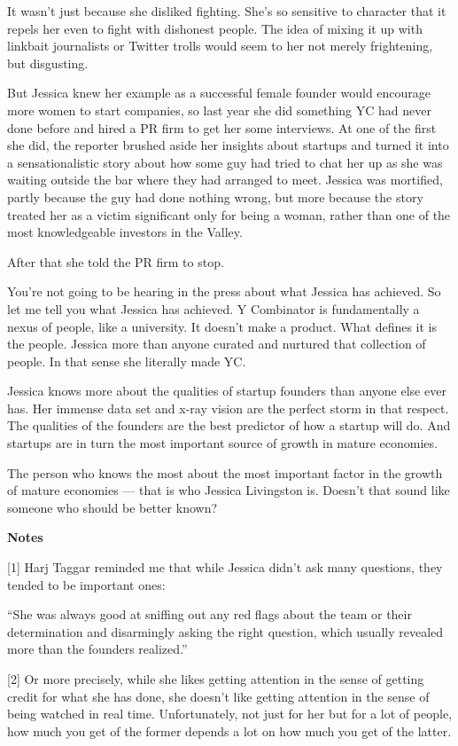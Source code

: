 It wasn't just because she disliked fighting. She's so sensitive to
character that it repels her even to fight with dishonest people. The
idea of mixing it up with linkbait journalists or Twitter trolls would
seem to her not merely frightening, but disgusting.

But Jessica knew her example as a successful female founder would
encourage more women to start companies, so last year she did something
YC had never done before and hired a PR firm to get her some interviews.
At one of the first she did, the reporter brushed aside her insights
about startups and turned it into a sensationalistic story about how
some guy had tried to chat her up as she was waiting outside the bar
where they had arranged to meet. Jessica was mortified, partly because
the guy had done nothing wrong, but more because the story treated her
as a victim significant only for being a woman, rather than one of the
most knowledgeable investors in the Valley.

After that she told the PR firm to stop.

You're not going to be hearing in the press about what Jessica has
achieved. So let me tell you what Jessica has achieved. Y Combinator is
fundamentally a nexus of people, like a university. It doesn't make a
product. What defines it is the people. Jessica more than anyone curated
and nurtured that collection of people. In that sense she literally made
YC.

Jessica knows more about the qualities of startup founders than anyone
else ever has. Her immense data set and x-ray vision are the perfect
storm in that respect. The qualities of the founders are the best
predictor of how a startup will do. And startups are in turn the most
important source of growth in mature economies.

The person who knows the most about the most important factor in the
growth of mature economies --- that is who Jessica Livingston is.
Doesn't that sound like someone who should be better known?

\textbf{Notes}

{[}1{]} Harj Taggar reminded me that while Jessica didn't ask many
questions, they tended to be important ones:

``She was always good at sniffing out any red flags about the team or
their determination and disarmingly asking the right question, which
usually revealed more than the founders realized.''

{[}2{]} Or more precisely, while she likes getting attention in the
sense of getting credit for what she has done, she doesn't like getting
attention in the sense of being watched in real time. Unfortunately, not
just for her but for a lot of people, how much you get of the former
depends a lot on how much you get of the latter.

